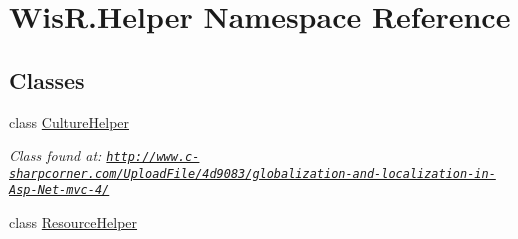 \hypertarget{namespace_wis_r_1_1_helper}{}\section{Wis\+R.\+Helper Namespace Reference}
\label{namespace_wis_r_1_1_helper}
\subsection*{Classes}
\begin{DoxyCompactItemize}
\item 
class \hyperlink{class_wis_r_1_1_helper_1_1_culture_helper}{Culture\+Helper}
\begin{DoxyCompactList}\small\item\em Class found at\+: \href{http://www.c-sharpcorner.com/UploadFile/4d9083/globalization-and-localization-in-Asp-Net-mvc-4/}{\tt http\+://www.\+c-\/sharpcorner.\+com/\+Upload\+File/4d9083/globalization-\/and-\/localization-\/in-\/\+Asp-\/\+Net-\/mvc-\/4/} \end{DoxyCompactList}\item 
class \hyperlink{class_wis_r_1_1_helper_1_1_resource_helper}{Resource\+Helper}
\end{DoxyCompactItemize}
